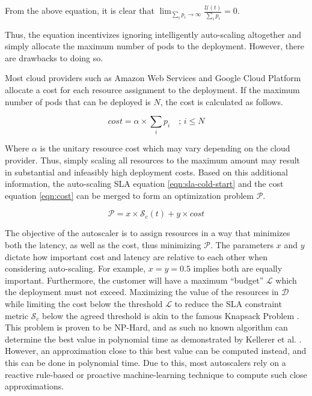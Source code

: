 From the above equation, it is clear that $\lim_{\sum_{i} p_{i} \to \infty} \frac{\mathcal{U}(t)}{\sum_{i} p_{i}} = 0$.


Thus, the equation incentivizes ignoring intelligently auto-scaling altogether and simply allocate the maximum number of pods to the deployment. However, there are drawbacks to doing so.\par

Most cloud providers such as Amazon Web Services and Google Cloud Platform allocate a cost for each resource assignment to the deployment. If the maximum number of pods that can be deployed is $N$, the cost is calculated as follows.

\begin{equation}
    cost = \alpha \times \sum_{i} p_{i} \quad ;\,i \le N
    \label{eqn:cost}
\end{equation}

Where $\alpha$ is the unitary resource cost which may vary depending on the cloud provider. Thus, simply scaling all resources to the maximum amount may result in substantial and infeasibly high deployment costs. Based on this additional information, the auto-scaling SLA equation \ref{eqn:sla-cold-start} and the cost equation \ref{eqn:cost} can be merged to form an optimization problem $\mathcal{P}$.

\begin{equation}
    \mathcal{P} = x \times \mathcal{S}_{c}(t) + y \times cost
    \label{eqn:optimization-problem}
\end{equation}

The objective of the autoscaler is to assign resources in a way that minimizes both the latency, as well as the cost, thus minimizing $\mathcal{P}$. The parameters $x$ and $y$ dictate how important cost and latency are relative to each other when considering auto-scaling. For example, $x = y = 0.5$ implies both are equally important. Furthermore, the customer will have a maximum ``budget'' $\mathcal{L}$ which the deployment must not exceed. Maximizing the value of the resources in $\mathcal{D}$ while limiting the cost below the threshold $\mathcal{L}$ to reduce the SLA constraint metric $\mathcal{S}_{c}$ below the agreed threshold is akin to the famous Knapsack Problem \cite{martello1987algorithms}. This problem is proven to be NP-Hard, and as such no known algorithm can determine the best value in polynomial time as demonstrated by Kellerer et al. \cite{kellerer2004introduction}. However, an approximation close to this best value can be computed instead, and this can be done in polynomial time. Due to this, most autoscalers rely on a reactive rule-based or proactive machine-learning technique to compute such close approximations.\par

